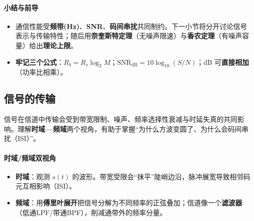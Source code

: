 \documentclass[lang=cn,newtx,10pt,scheme=chinese]{../../elegantbook}
\begin{document}
\paragraph{小结与前导}
\begin{itemize}
    \item 通信性能受\textbf{频带(Hz)}、\textbf{SNR}、\textbf{码间串扰}共同制约。下一小节将分开讨论信号表示与传输特性；随后用\textbf{奈奎斯特定理}（无噪声限速）与\textbf{香农定理}（有噪声容量）给出\textbf{理论上限}。
    \item \textbf{牢记三个公式}：$R_b = R_s\log_2 M$；$\mathrm{SNR_{dB}}=10\log_{10}(S/N)$；dB 可\textbf{直接相加}（功率比相乘）。
\end{itemize}

\begin{center}
{\setlength{\fboxsep}{6pt}%
}%
\end{center}

\subsection{信号的传输}
信号在信道中传输会受到带宽限制、噪声、频率选择性衰减与时延失真的共同影响。理解\textbf{时域—频域}两个视角，有助于掌握“为什么方波变圆了、为什么会码间串扰（ISI）”。

\paragraph{时域/频域双视角}
\begin{itemize}
    \item \textbf{时域}：观测 $s(t)$ 的波形。带宽受限会“抹平”陡峭边沿，脉冲展宽导致相邻码元互相影响（ISI）。
    \item \textbf{频域}：用\textbf{傅里叶展开}把信号分解为不同频率的正弦叠加；信道像一个\textbf{滤波器}（低通LPF/带通BPF），削减通带外的频率分量。
\end{itemize}
\end{document}
